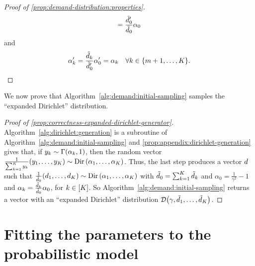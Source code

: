\begin{proof}[Proof of \cref{prop:demand-distribution:properties}]
\begin{equation}
  = \frac{\tilde{d}_0'}{\tilde{d}_0}\alpha_0
\end{equation}
and
\begin{equation}
  \alpha_k' = \frac{\tilde{\demand}_k}{\tilde{\demand}_0'}\alpha_0' = \alpha_k\quad\forall k\in\range[m+1]{K}.
\end{equation}
\end{proof}


We now prove that Algorithm~\ref{alg:demand:initial-sampling} samples the ``expanded Dirichlet'' distribution.


\begin{proof}[Proof of \cref{prop:correctness-expanded-dirichlet-generator}]
Algorithm~\ref{alg:dirichlet:generation} is a subroutine of Algorithm~\ref{alg:demand:initial-sampling} and \cref{prop:appendix:dirichlet-generation} gives that, if $y_k\sim\Gamma\bracket{\alpha_k,1}$, then the random vector $\frac{1}{\sum_{k=1}^K y_k}\bracket{y_1,\ldots,y_K}\sim\Dir\bracket{\alpha_1,\ldots,\alpha_K}$.
Thus, the last step produces a vector $d$ such that $\frac{1}{\tilde{\demand}_0}\bracket{\demand_1,\ldots,\demand_K}\sim\Dir\bracket{\alpha_1,\ldots,\alpha_K}$ with $\tilde{d}_0 = \sum_{k=1}^K\tilde{d}_k$ and $\alpha_0 = \frac{1}{\gamma^2}-1$ and $\alpha_k=\frac{\tilde{d}_k}{\tilde{d}_0}\alpha_0$, for $k\in\range{K}$.
So Algorithm~\ref{alg:demand:initial-sampling} returns a vector with an ``expanded Dirichlet'' distribution $\cD\bracket{\gamma,\tilde{\demand}_1,\ldots,\tilde{\demand}_K}$.
\end{proof}


\section{Fitting the parameters to the probabilistic model}
\label{sec:PDP:numerical-experiments:instances:fitting-parameters}


